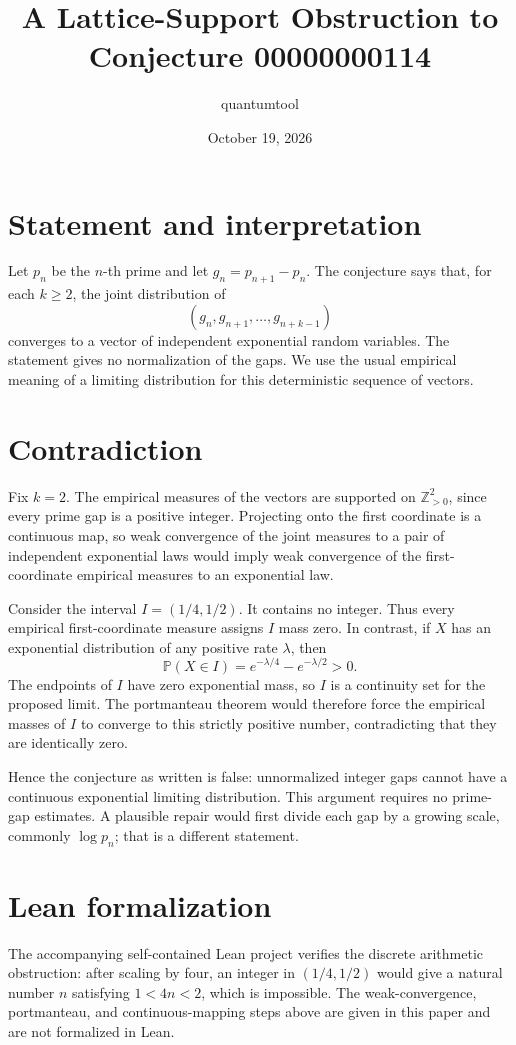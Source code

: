 \documentclass[11pt]{article}
\title{A Lattice-Support Obstruction to Conjecture 00000000114}
\author{quantumtool}
\date{October 19, 2026}
\begin{document}
\maketitle

\section*{Statement and interpretation}
Let $p_n$ be the $n$-th prime and let $g_n=p_{n+1}-p_n$. The conjecture says that, for each $k\ge 2$, the joint distribution of
\[
  (g_n,g_{n+1},\ldots,g_{n+k-1})
\]
converges to a vector of independent exponential random variables. The statement gives no normalization of the gaps. We use the usual empirical meaning of a limiting distribution for this deterministic sequence of vectors.

\section*{Contradiction}
Fix $k=2$. The empirical measures of the vectors are supported on $\mathbb{Z}_{>0}^2$, since every prime gap is a positive integer. Projecting onto the first coordinate is a continuous map, so weak convergence of the joint measures to a pair of independent exponential laws would imply weak convergence of the first-coordinate empirical measures to an exponential law.

Consider the interval $I=(1/4,1/2)$. It contains no integer. Thus every empirical first-coordinate measure assigns $I$ mass zero. In contrast, if $X$ has an exponential distribution of any positive rate $\lambda$, then
\[
  \mathbb{P}(X\in I)=e^{-\lambda/4}-e^{-\lambda/2}>0.
\]
The endpoints of $I$ have zero exponential mass, so $I$ is a continuity set for the proposed limit. The portmanteau theorem would therefore force the empirical masses of $I$ to converge to this strictly positive number, contradicting that they are identically zero.

Hence the conjecture as written is false: unnormalized integer gaps cannot have a continuous exponential limiting distribution. This argument requires no prime-gap estimates. A plausible repair would first divide each gap by a growing scale, commonly $\log p_n$; that is a different statement.

\section*{Lean formalization}
The accompanying self-contained Lean project verifies the discrete arithmetic obstruction: after scaling by four, an integer in $(1/4,1/2)$ would give a natural number $n$ satisfying $1<4n<2$, which is impossible. The weak-convergence, portmanteau, and continuous-mapping steps above are given in this paper and are not formalized in Lean.
\end{document}
